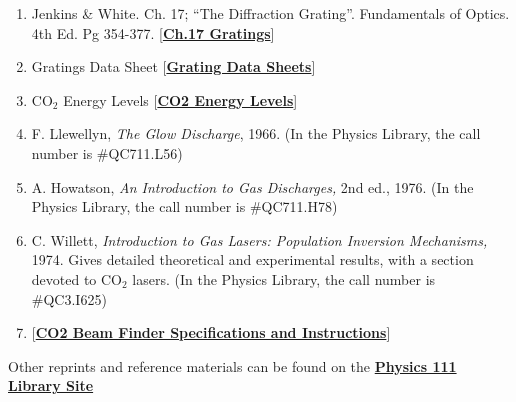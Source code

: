 \documentclass{../lab}
\begin{document}
\begin{enumerate}
    \item Jenkins \& White. Ch. 17; ``The Diffraction Grating''. Fundamentals of Optics. 4th Ed. Pg 354-377. [\href{http://physics111.lib.berkeley.edu/Physics111/Reprints/CO2/OCR\%20ch.\%2017\%20the\%20diffraction\%20grating.pdf}{\textbf{Ch.17 Gratings}}]

    \item Gratings Data Sheet [\href{http://physics111.lib.berkeley.edu/Physics111/Reprints/CO2/grating.pdf}{\textbf{Grating Data Sheets}}]

    \item CO$_2$ Energy Levels [\href{http://physics111.lib.berkeley.edu/Physics111/Reprints/CO2/CO\_2\%20Energy\%20Levels.pdf}{\textbf{CO2 Energy Levels}}]

    \item F. Llewellyn, \emph{The Glow Discharge}, 1966. (In the Physics Library, the call number is \#QC711.L56)

    \item A. Howatson, \emph{An Introduction to Gas Discharges,} 2nd ed., 1976. (In the Physics Library, the call number is \#QC711.H78)

    \item C. Willett, \emph{Introduction to Gas Lasers: Population Inversion Mechanisms,} 1974. Gives detailed theoretical and experimental results, with a section devoted to CO$_2$ lasers.  (In the Physics Library, the call number is \#QC3.I625)

    \item {[\href{http://physics111.lib.berkeley.edu/Physics111/Reprints/CO2/CO2\_beam\_finder\_instructions.pdf}{\textbf{CO2 Beam Finder Specifications and Instructions}}]}

\end{enumerate}

Other reprints and reference materials can be found on the \href{http://physics111.lib.berkeley.edu/Physics111/Reprints/CO2/CO2\_index.html}{\textbf{Physics 111 Library Site}}
\end{document}
